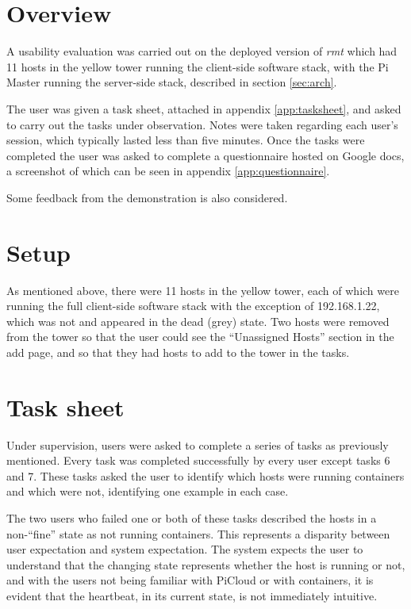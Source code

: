 \label{sec:evaluation}

\section{Overview}
A usability evaluation was carried out on the deployed version of \emph{rmt} which had 11 hosts in the yellow tower running the client-side software stack, with the Pi Master running the server-side stack, described in section \ref{sec:arch}.

The user was given a task sheet, attached in appendix \ref{app:tasksheet}, and asked to carry out the tasks under observation.
Notes were taken regarding each user's session, which typically lasted less than five minutes.
Once the tasks were completed the user was asked to complete a questionnaire hosted on Google docs, a screenshot of which can be seen in appendix \ref{app:questionnaire}.

Some feedback from the demonstration is also considered.

\section{Setup}

As mentioned above, there were 11 hosts in the yellow tower, each of which were running the full client-side software stack with the exception of 192.168.1.22, which was not and appeared in the dead (grey) state.
Two hosts were removed from the tower so that the user could see the ``Unassigned Hosts'' section in the add page, and so that they had hosts to add to the tower in the tasks.


\section{Task sheet}

Under supervision, users were asked to complete a series of tasks as previously mentioned.
Every task was completed successfully by every user except tasks 6 and 7.
These tasks asked the user to identify which hosts were running containers and which were not, identifying one example in each case.

The two users who failed one or both of these tasks described the hosts in a non-``fine'' state as not running containers.
This represents a disparity between user expectation and system expectation.
The system expects the user to understand that the changing state represents whether the host is running or not, and with the users not being familiar with PiCloud or with containers, it is evident that the heartbeat, in its current state, is not immediately intuitive.

